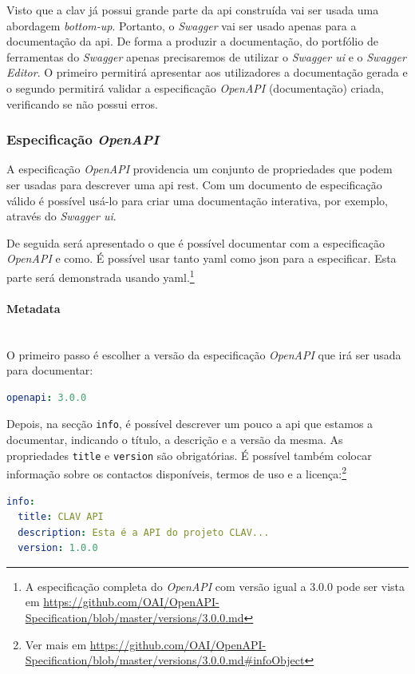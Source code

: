 Visto que a \acrshort{clav} já possui grande parte da \acrshort{api} construída vai ser usada uma abordagem 
\textit{bottom-up}. Portanto, o \textit{Swagger} vai ser usado apenas para a documentação da \acrshort{api}. 
De forma a produzir a documentação, do portfólio de ferramentas do \textit{Swagger} apenas precisaremos de 
utilizar o \textit{Swagger \acrshort{ui}} e o \textit{Swagger Editor}. O primeiro permitirá apresentar aos 
utilizadores a documentação gerada e o segundo permitirá validar a especificação \textit{OpenAPI} (documentação) 
criada, verificando se não possui erros.

\subsubsection{Especificação \textit{OpenAPI}}

A especificação \textit{OpenAPI} providencia um conjunto de propriedades que podem ser usadas para descrever 
uma \acrshort{api} \acrshort{rest}. Com um documento de especificação válido é possível usá-lo para criar uma 
documentação interativa, por exemplo, através do \textit{Swagger \acrshort{ui}}.

De seguida será apresentado o que é possível documentar com a especificação \textit{OpenAPI} e como. 
É possível usar tanto \acrshort{yaml} como \acrshort{json} para a especificar. Esta parte será demonstrada 
usando \acrshort{yaml}.\footnote{A especificação completa do \textit{OpenAPI} com versão igual a 3.0.0 pode 
ser vista em \url{https://github.com/OAI/OpenAPI-Specification/blob/master/versions/3.0.0.md}}

\paragraph{Metadata} \mbox{} \\
O primeiro passo é escolher a versão da especificação \textit{OpenAPI} que irá ser usada para documentar:
\begin{lstlisting}[language=yaml, caption=Exemplo de indicação da versão da especificação \textit{OpenAPI}]
openapi: 3.0.0
\end{lstlisting}

Depois, na secção \texttt{info}, é possível descrever um pouco a \acrshort{api} que estamos a documentar, 
indicando o título, a descrição e a versão da mesma. As propriedades \texttt{title} e \texttt{version} são 
obrigatórias. É possível também colocar informação sobre os contactos disponíveis, termos de uso e a 
licença:\footnote{Ver mais em \url{https://github.com/OAI/OpenAPI-Specification/blob/master/versions/3.0.0.md\#infoObject}}
\begin{lstlisting}[language=yaml, caption={Exemplo de secção \texttt{info} indicando título, descrição e versão da \acrshort{api} na especificação \textit{OpenAPI}}]
info:
  title: CLAV API
  description: Esta é a API do projeto CLAV...
  version: 1.0.0
\end{lstlisting}

